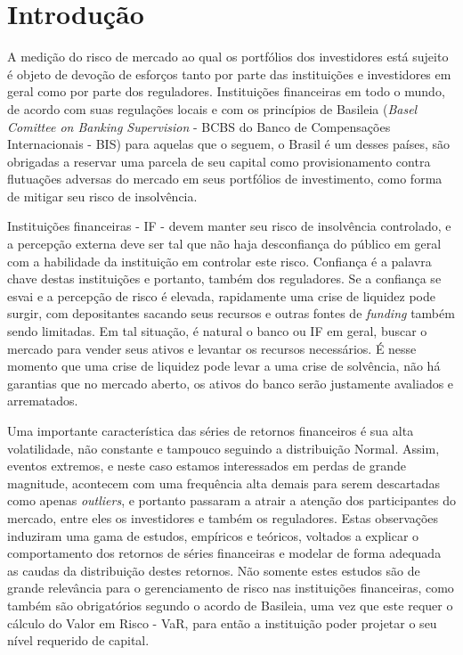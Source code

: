 \documentclass[1p]{elsarticle}
\theoremstyle{definition}
\begin{document}
\linenumbers

\section{Introdução}

A medição do risco de mercado ao qual os portfólios dos investidores está sujeito é objeto de devoção de esforços tanto por parte das instituições e investidores em geral como por parte dos reguladores. Instituições financeiras em todo o mundo, de acordo com suas regulações locais e com os princípios de Basileia (\emph{Basel Comittee on Banking Supervision} - BCBS do Banco de Compensações Internacionais - BIS) para aquelas que o seguem, o Brasil é um desses países, são obrigadas a reservar uma parcela de seu capital como provisionamento contra flutuações adversas do mercado em seus portfólios de investimento, como forma de mitigar seu risco de insolvência.

Instituições financeiras - IF - devem manter seu risco de insolvência controlado, e a percepção externa deve ser tal que não haja desconfiança do público em geral com a habilidade da instituição em controlar este risco. Confiança é a palavra chave destas instituições e portanto, também dos reguladores. Se a confiança se esvai e a percepção de risco é elevada, rapidamente uma crise de liquidez pode surgir, com depositantes sacando seus recursos e outras fontes de \emph{funding} também sendo limitadas. Em tal situação, é natural o banco ou IF em geral, buscar o mercado para vender seus ativos e levantar os recursos necessários. É nesse momento que uma crise de liquidez pode levar a uma crise de solvência, não há garantias que no mercado aberto, os ativos do banco serão justamente avaliados e arrematados.

Uma importante característica das séries de retornos financeiros é sua alta volatilidade, não constante e tampouco seguindo a distribuição Normal. Assim, eventos extremos, e neste caso estamos interessados em perdas de grande magnitude, acontecem com uma frequência alta demais para serem descartadas como apenas \emph{outliers}, e portanto passaram a atrair a atenção dos participantes do mercado, entre eles os investidores e também os reguladores. Estas observações induziram uma gama de estudos, empíricos e teóricos, voltados a explicar o comportamento dos retornos de séries financeiras e modelar de forma adequada as caudas da distribuição destes retornos. Não somente estes estudos são de grande relevância para o gerenciamento de risco nas instituições financeiras, como também são obrigatórios segundo o acordo de Basileia, uma vez que este requer o cálculo do Valor em Risco - VaR, para então a instituição poder projetar o seu nível requerido de capital. 
\end{document}

